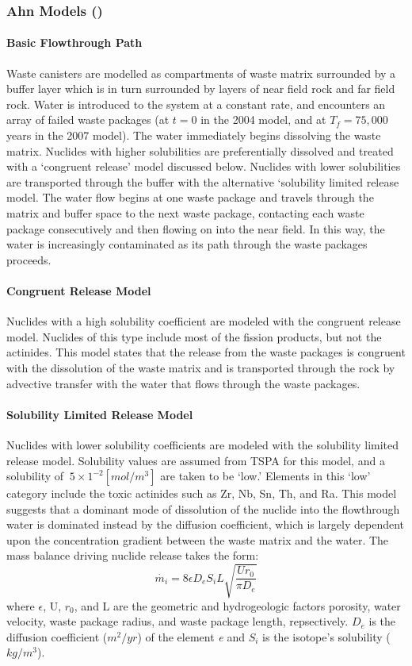 \subsubsection{Ahn Models (\cite{ahn_environmental_2004, 
ahn_environmental_2007})}

\paragraph{Basic Flowthrough Path}
Waste canisters are modelled as compartments of waste matrix 
surrounded by a buffer layer which is in turn surrounded by layers of 
near field rock and far field rock. Water is introduced to the system 
at a constant rate, and encounters an array of failed waste packages 
(at $t=0$ in the 2004 model, and at $T_f=75,000$ years in the 2007 
model). The water immediately begins dissolving the waste matrix. 
Nuclides with higher solubilities are preferentially dissolved and 
treated with a `congruent release' model discussed below. Nuclides 
with lower solubilities are transported through the buffer with the 
alternative `solubility limited release model. The water flow begins 
at one waste package and travels through the matrix and buffer space 
to the next waste package, contacting each waste package consecutively 
and then flowing on into the near field. In this way, the water is 
increasingly contaminated as its path through the waste packages 
proceeds.  \paragraph{Congruent Release Model} Nuclides with a high 
solubility coefficient are modeled with the congruent release model. 
Nuclides of this type include most of the fission products, but not 
the actinides. This model states that the release from the waste 
packages is congruent with the dissolution of the waste matrix and is 
transported through the rock by advective transfer with the water that 
flows through the waste packages.  \paragraph{Solubility Limited 
Release Model}
Nuclides with lower solubility coefficients are modeled with the 
solubility limited release model.  Solubility values are assumed from 
TSPA for this model, and a solubility of $~5\times 1^{-2} [mol/m^3]$ 
are taken to be `low.' Elements in this `low' category include the 
toxic actinides such as Zr, Nb, Sn, Th, and Ra. This model suggests 
that a dominant mode of dissolution of the nuclide into the 
flowthrough water is dominated instead by the diffusion coefficient, 
which is largely dependent upon the concentration gradient between the 
waste matrix and the water. The mass balance driving nuclide release 
takes the form:
\begin{equation}
\dot{m_i}=8\epsilon D_eS_iL\sqrt{\frac{Ur_0}{\pi D_e}}
\end{equation}
where $\epsilon$, U, $r_0$, and L are the geometric and hydrogeologic 
factors porosity, water velocity, waste package radius, and waste 
package length, repsectively. $D_e$ is the diffusion coefficient 
($m^2/yr$) of the element \emph{e} and $S_i$ is the isotope's 
solubility ($kg/m^3$).

